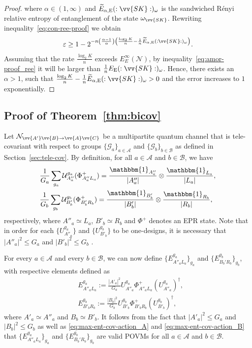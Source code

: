 \documentclass[aps,pra,twocolumn,superscriptaddress,longbibliography]{revtex4-1}
\def\E{\operatorname{E}}
\def\({\left(}
\def\){\right)}
\newcommand{\mc}[1]{\mathcal{#1}}
\newcommand{\msc}[1]{\mathscr{#1}}
\newcommand{\bbm}[1]{\mathbbm{#1}}
\begin{document}
\begin{appendix}
\begin{proof}
where $\alpha\in(1,\infty)$ and $\widetilde{E}_{\alpha,\E}(:\vv{SK}:)_{\omega}$ is the sandwiched R\'{e}nyi relative entropy of entanglement of the state $\omega_{\vv{SK}}$. Rewriting inequality~\eqref{eq:con-ree-proof} we obtain
\begin{equation}
\varepsilon\geq 1- 2^{-n\(\frac{\alpha-1}{\alpha}\)\(\frac{\log_2 K}{n}-\frac{1}{n}\widetilde{E}_{\alpha,\E}(:\vv{SK}:)_{\omega}\)}.
\end{equation}
Assuming that the rate $\frac{\log_2 K}{n}$ exceeds $E_{E}^\infty(\mc{N})$, by inequality~\eqref{eq:amor-proof_ree} it will be larger than $\frac{1}{n}E_{\E}(:\vv{SK}:)_{\omega}$. Hence, there exists an $\alpha>1$, such that $\frac{\log_2 K}{n}-\frac{1}{n}\widetilde{E}_{\alpha,\E}(:\vv{SK}:)_{\omega}>0$ and the error increases to $1$ exponentially.
\end{proof}
\subsection{Proof of Theorem~\ref{thm:bicov}}\label{app:tele-cov}
Let $\mc{N}_{\vv{A'}\vv{B}\to\vv{A}\vv{C}}$ be a multipartite 
quantum channel that is tele-covariant with respect to groups $\{\msc{G}_a\}_{a\in\msc{A}}$ and $\{\msc{G}_b\}_{b\in\msc{B}}$ as defined in Section~\ref{sec:tele-cov}.
By definition, for all $a\in\msc{A}$ and $b\in\msc{B}$, we have
\begin{align}
&\frac{1}{G_a}\sum_{g_a}\mathcal{U}_{A''_a}^{g_a}(\Phi^+_{A''_aL_a})=\frac{\bbm{1}_{A''_a}}{|A''_a|}\otimes\frac{\bbm{1}_{L_a}}{|L_a|},\label{eq:max-ent-cov-action_A}\\
&\frac{1}{G_b}\sum_{g_b}\mathcal{U}_{B'_b}^{g_b}(\Phi^+_{B'_bR_b})=\frac{\bbm{1}_{B'_b}}{|B'_b|}\otimes\frac{\bbm{1}_{R_b}}{|R_b|},\label{eq:max-ent-cov-action_B}
\end{align}
respectively, where $A''_a\simeq L_a$, $B'_b\simeq R_b$ and $\Phi^+$ denotes an EPR state. Note that in order for each $\{U_{A''_a}^{g_a}\}$ and $\{U_{B'_b}^{g_b}\}$ to be one-designs, it is necessary that $\left\vert A''_a\right\vert ^{2}\leq G_a $ and $\left\vert B'_b\right\vert ^{2}\leq G_b $ \cite{AMTW00}.

For every $a\in\msc{A}$ and every $b\in\msc{B}$, we can now define $\{E_{A''_aL_a}^{g_a}\}_{g_a}$ and $\{E_{B_b'R_b}^{g_b}\}_{g_b}$,
with respective elements defined as
\begin{align}
&E_{A''_aL_a}^{g_a}:=\frac{\left\vert A'_a\right\vert
^{2}}{G_a }U_{A''_a}^{g_a}\Phi^+_{A''_aL_a}\left(  U_{A''_a}^{g_a}\right)  ^{\dag},\\
&E_{B'_bR_b}^{g_b}:=\frac{\left\vert B_b\right\vert
^{2}}{G_b }U_{B'_b}^{g_b}\Phi^+_{B'_bR_b}\left(  U_{B'_b}^{g_b}\right)  ^{\dag},
\end{align}
where $A'_a\simeq A''_a$ and $B_b\simeq B'_b$. It follows from the fact that $\left\vert A'_a\right\vert ^{2}
\leq G_a$ and $\left\vert B_b\right\vert ^{2}
\leq G_b$ as well as  \eqref{eq:max-ent-cov-action_A} and \eqref{eq:max-ent-cov-action_B} that
$\{E_{A''_aL_a}^{g_a}\}_{g_a}$ and $\{E_{B_b'R_b}^{g_b}\}_{g_b}$ are valid POVMs for all $a\in\msc{A}$ and $b\in\msc{B}$.



\end{appendix}
\end{document}
